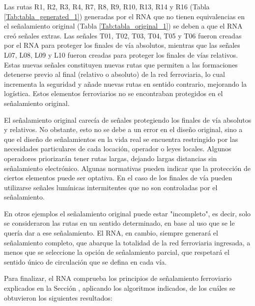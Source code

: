     Las rutas R1, R2, R3, R4, R7, R8, R9, R10, R13, R14 y R16 (Tabla \ref{Tab:tabla_generated_1}) generadas por el RNA que no tienen equivalencias en el señalamiento original (Tabla \ref{Tab:tabla_original_1}) se deben a que el RNA creó señales extras. Las señales T01, T02, T03, T04, T05 y T06 fueron creadas por el RNA para proteger los finales de vía absolutos, mientras que las señales L07, L08, L09 y L10 fueron creadas para proteger los finales de vías relativos. Estas nuevas señales constituyen nuevas rutas que permiten a las formaciones detenerse previo al final (relativo o absoluto) de la red ferroviaria, lo cual incrementa la seguridad y añade nuevas rutas en sentido contrario, mejorando la logística. Estos elementos ferroviarios no se encontraban protegidos en el señalamiento original.
    
    El señalamiento original carecía de señales protegiendo los finales de vía absolutos y relativos. No obstante, esto no se debe a un error en el diseño original, sino a que el diseño de señalamientos en la vida real se encuentra restringido por las necesidades particulares de cada locación, operador o leyes locales. Algunos operadores priorizarán tener rutas largas, dejando largas distancias sin señalamiento electrónico. Algunas normativas pueden indicar que la protección de ciertos elementos puede ser optativa. En el caso de los finales de vía pueden utilizarse señales lumínicas intermitentes que no son controladas por el señalamiento.
    
    En otros ejemplos el señalamiento original puede estar "incompleto", es decir, solo se consideraron las rutas en un sentido determinado, en base al uso que se le quería dar a ese señalamiento. El RNA, en cambio, siempre generará el señalamiento completo, que abarque la totalidad de la red ferroviaria ingresada, a menos que se seleccione la opción de señalamiento parcial, que respetará el sentido único de circulación que se defina en cada vía.    
    
    Para finalizar, el RNA comprueba los principios de señalamiento ferroviario explicados en la Sección \label{sec:validar_principios}, aplicando los algoritmos indicados, de los cuáles se obtuvieron los siguientes resultados:
    
